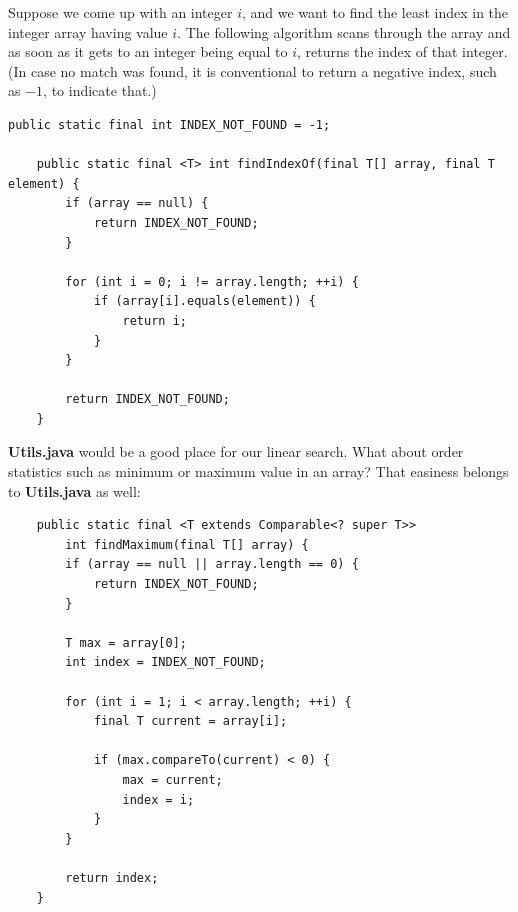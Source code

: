 \documentclass[oneside]{book}
\begin{document}
Suppose we come up with an integer $i$, and we want to find the least index in the integer array having value $i$. The following algorithm scans through the array and as soon as it gets to an integer being equal to $i$, returns the index of that integer. (In case no match was found, it is conventional to return a negative index, such as $-1$, to indicate that.)
\begin{lstlisting}[caption={Linear search algorithm}]
    public static final int INDEX_NOT_FOUND = -1;
    
    public static final <T> int findIndexOf(final T[] array, final T element) {
        if (array == null) {
            return INDEX_NOT_FOUND;
        }
        
        for (int i = 0; i != array.length; ++i) {
            if (array[i].equals(element)) {
                return i;
            }
        }
        
        return INDEX_NOT_FOUND;
    }
\end{lstlisting}
\textbf{Utils.java} would be a good place for our linear search. What about order statistics such as minimum or maximum value in an array? That easiness belongs to \textbf{Utils.java} as well:
\begin{lstlisting}
    public static final <T extends Comparable<? super T>> 
        int findMaximum(final T[] array) {
        if (array == null || array.length == 0) {
            return INDEX_NOT_FOUND;
        }
        
        T max = array[0];
        int index = INDEX_NOT_FOUND;
        
        for (int i = 1; i < array.length; ++i) {
            final T current = array[i];
            
            if (max.compareTo(current) < 0) {
                max = current;
                index = i;
            }
        }
        
        return index;
    }
\end{lstlisting}
\end{document}
